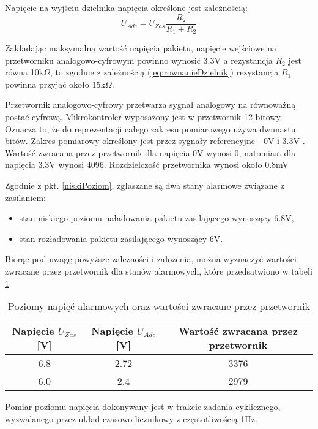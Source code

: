 Napięcie na wyjściu dzielnika napięcia określone jest zależnością:
\begin{equation}
    U_{Adc}=U_{Zas}\frac{R_2}{R_1 + R_2}
    \label{eq:rownanieDzielnik}
\end{equation}

Zakładając maksymalną wartość napięcia pakietu, napięcie wejściowe na przetworniku analogowo-cyfrowym powinno wynosić 3.3V a rezystancja $R_2$ jest równa 10k$\Omega$, to zgodnie z zależnością (\ref{eq:rownanieDzielnik}) rezystancja $R_1$ powinna przyjąć około 15k$\Omega$.

Przetwornik analogowo-cyfrowy przetwarza sygnał analogowy na równoważną postać cyfrową. Mikrokontroler wyposażony jest w przetwornik 12-bitowy. Oznacza to, że do reprezentacji całego zakresu pomiarowego używa dwunastu bitów. Zakres pomiarowy określony jest przez sygnały referencyjne - 0V i 3.3V \cite{tiva}. Wartość zwracana przez przetwornik dla napięcia 0V wynosi 0, natomiast dla napięcia 3.3V wynosi 4096. Rozdzielczość przetwornika wynosi około 0.8mV

Zgodnie z pkt. \ref{niskiPoziom}, zgłaszane są dwa stany alarmowe związane z zasilaniem:
\begin{itemize}
\item
    stan niskiego poziomu naładowania pakietu zasilającego wynoszący 6.8V,
\item
    stan rozładowania pakietu zasilającego wynoszący 6V.
\end{itemize}

Biorąc pod uwagę powyższe zależności i założenia, można wyznaczyć wartości zwracane przez przetwornik dla stanów alarmowych, które przedsatwiono w tabeli \ref{tab:napieciaDwojnik}

\begin{table}[h]
    \caption{Poziomy napięć alarmowych oraz wartości zwracane przez przetwornik}
    \begin{center}
		\label{tab:napieciaDwojnik}
		\begin{tabular}{|c|c|c|}
			\hline
 			\textbf{Napięcie $U_{Zas}$ [V]}& \textbf{Napięcie $U_{Adc}$ [V]}& \textbf{Wartość zwracana przez przetwornik} \\
 			\hline
 			6.8 & 2.72 & 3376 \\  
 			\hline
			6.0 & 2.4 & 2979 \\
			\hline
		\end{tabular}
	\end{center}
\end{table}

Pomiar poziomu napięcia dokonywany jest w trakcie zadania cyklicznego, wyzwalanego przez układ czasowo-licznikowy z częstotliwością 1Hz.




